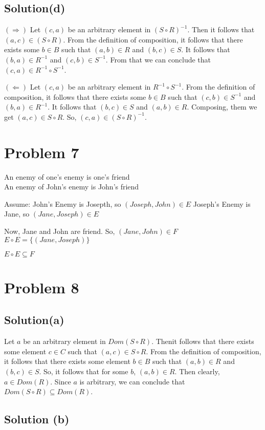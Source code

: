 \documentclass{article}
\begin{document}
\subsection{Solution(d)}
\noindent

$(\Rightarrow)$ Let $(c,a)$ be an arbitrary element in $(S \circ
R)^{-1}$. Then it follows that $(a,c) \in (S \circ R)$. From the
definition of composition, it follows that there exists some $b \in B$
such that $(a,b) \in R$ and $(b,c) \in S$. It follows that $(b,a) \in
R^{-1}$ and $(c,b) \in S^{-1}$. From that we can conclude that $(c,a)
\in R^{-1} \circ S^{-1}$.

$(\Leftarrow)$ Let $(c,a)$ be an arbitrary element in $R^{-1} \circ
S^{-1}$. From the definition of composition, it follows that there
exists some $b \in B$ such that $(c,b) \in S^{-1}$ and $(b,a) \in
R^{-1}$. It follows that $(b,c) \in S$ and $(a,b) \in R$. Composing,
them we get $(a,c) \in S \circ R$. So, $(c,a) \in (S \circ R)^{-1}$.

\section{Problem 7}

An enemy of one's enemy is one's friend \\
An enemy of John's enemy is John's friend

Assume: John's Enemy is Josepth, so $(Joseph, John) \in E$
Joseph's Enemy is Jane, so $(Jane, Joseph) \in E$

Now, Jane and John are friend. So, $(Jane, John) \in F$
$E \circ E = \{(Jane, Joseph)\}$

$E \circ E \subseteq F$

\section{Problem 8}
\subsection{Solution(a)}
Let $a$ be an arbitrary element in $Dom(S \circ R)$. Thenit follows
that there exists some element $c \in C$ such that $(a,c) \in S \circ
R$. From the definition of composition, it follows that there exists
some element $b \in B$ such that $(a,b) \in R$ and $(b,c) \in S$. So,
it follows that for some $b$, $(a,b) \in R$. Then clearly, $a \in
Dom(R)$. Since $a$ is arbitrary, we can conclude that $Dom(S \circ R)
\subseteq Dom(R)$.

\subsection{Solution (b)}
\end{document}
